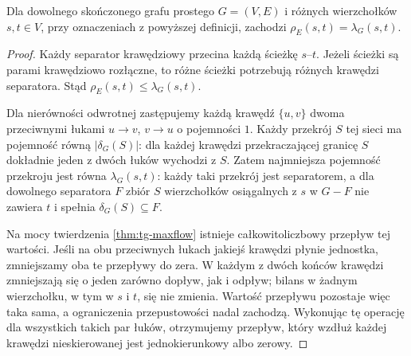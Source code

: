 \begin{twierdzenie}
\label{thm:tg-menger-edge}
Dla dowolnego skończonego grafu prostego $G=(V,E)$
i różnych wierzchołków $s,t\in V$, przy oznaczeniach
z powyższej definicji, zachodzi
$\rho_E(s,t)=\lambda_G(s,t)$.
\end{twierdzenie}

\begin{proof}
Każdy separator krawędziowy przecina każdą ścieżkę
$s$--$t$. Jeżeli ścieżki są parami krawędziowo rozłączne,
to różne ścieżki potrzebują różnych krawędzi separatora.
Stąd $\rho_E(s,t)\le\lambda_G(s,t)$.

Dla nierówności odwrotnej zastępujemy każdą krawędź
$\{u,v\}$ dwoma przeciwnymi łukami $u\to v$, $v\to u$
o pojemności $1$. Każdy przekrój $S$ tej sieci ma
pojemność równą $|\delta_G(S)|$: dla każdej krawędzi
przekraczającej granicę $S$ dokładnie jeden z dwóch
łuków wychodzi z $S$. Zatem najmniejsza pojemność
przekroju jest równa $\lambda_G(s,t)$:
każdy taki przekrój jest separatorem, a dla dowolnego
separatora $F$ zbiór $S$ wierzchołków osiągalnych z $s$
w $G-F$ nie zawiera $t$ i spełnia $\delta_G(S)\subseteq F$.

Na mocy twierdzenia \ref{thm:tg-maxflow} istnieje
całkowitoliczbowy przepływ tej wartości. Jeśli na
obu przeciwnych łukach jakiejś krawędzi płynie
jednostka, zmniejszamy oba te przepływy do zera.
W każdym z dwóch końców krawędzi zmniejszają się
o jeden zarówno dopływ, jak i odpływ; bilans
w żadnym wierzchołku, w tym w $s$ i $t$, się nie
zmienia. Wartość przepływu pozostaje więc taka
sama, a ograniczenia przepustowości nadal zachodzą.
Wykonując tę operację dla wszystkich takich par
łuków, otrzymujemy przepływ, który wzdłuż każdej
krawędzi nieskierowanej jest jednokierunkowy albo
zerowy.


\end{proof}
